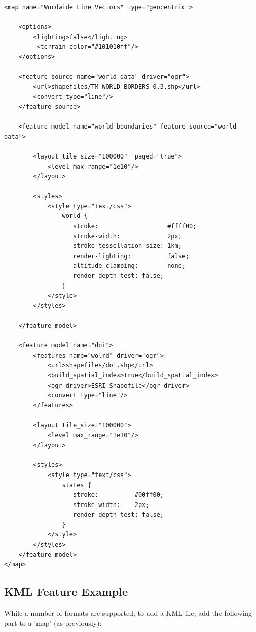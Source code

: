 \begin{lstlisting}
<map name="Wordwide Line Vectors" type="geocentric">
  
    <options>
        <lighting>false</lighting>
         <terrain color="#101010ff"/>
    </options>

    <feature_source name="world-data" driver="ogr">
        <url>shapefiles/TM_WORLD_BORDERS-0.3.shp</url>
        <convert type="line"/>
    </feature_source>
    
    <feature_model name="world_boundaries" feature_source="world-data">
        
        <layout tile_size="100000"  paged="true">
            <level max_range="1e10"/>
        </layout>
                
        <styles>
            <style type="text/css">
                world {
                   stroke:                   #ffff00;
                   stroke-width:             2px;
                   stroke-tessellation-size: 1km;
                   render-lighting:          false;
                   altitude-clamping:        none;
                   render-depth-test: false;                   
                }            
            </style>
        </styles>
        
    </feature_model>
  
    <feature_model name="doi">
        <features name="wolrd" driver="ogr">
            <url>shapefiles/doi.shp</url>
            <build_spatial_index>true</build_spatial_index>
            <ogr_driver>ESRI Shapefile</ogr_driver>
            <convert type="line"/>
        </features>        

        <layout tile_size="100000">
            <level max_range="1e10"/>
        </layout>

        <styles>
            <style type="text/css">
                states {
                   stroke:          #00ff00; 
                   stroke-width:    2px;
                   render-depth-test: false;
                }                    
            </style>
        </styles>        
    </feature_model>
</map>
\end{lstlisting}

\subsection{KML Feature Example}

While a number of formats are supported, to add a KML file, add the following part to a 'map' (as previously):

